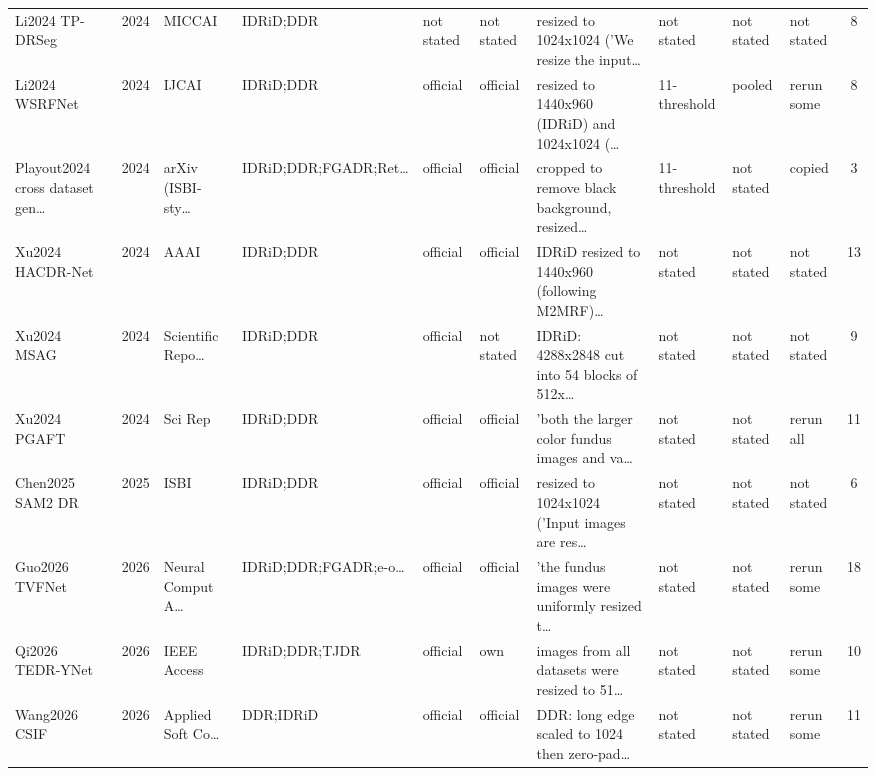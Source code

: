 \begin{landscape}
{\begin{longtable}{p{34mm} c p{20mm} p{24mm} p{14mm} p{14mm} p{48mm} p{18mm} p{14mm} p{16mm} c}
Li2024 TP-DRSeg & 2024 & MICCAI & IDRiD;DDR & not stated & not stated & resized to 1024x1024 ('We resize the input… & not stated & not stated & not stated & 8 \\
Li2024 WSRFNet & 2024 & IJCAI & IDRiD;DDR & official & official & resized to 1440x960 (IDRiD) and 1024x1024 (… & 11-threshold & pooled & rerun some & 8 \\
Playout2024 cross dataset gen… & 2024 & arXiv (ISBI-sty… & IDRiD;DDR;FGADR;Ret… & official & official & cropped to remove black background, resized… & 11-threshold & not stated & copied & 3 \\
Xu2024 HACDR-Net & 2024 & AAAI & IDRiD;DDR & official & official & IDRiD resized to 1440x960 (following M2MRF)… & not stated & not stated & not stated & 13 \\
Xu2024 MSAG & 2024 & Scientific Repo… & IDRiD;DDR & official & not stated & IDRiD: 4288x2848 cut into 54 blocks of 512x… & not stated & not stated & not stated & 9 \\
Xu2024 PGAFT & 2024 & Sci Rep & IDRiD;DDR & official & official & 'both the larger color fundus images and va… & not stated & not stated & rerun all & 11 \\
Chen2025 SAM2 DR & 2025 & ISBI & IDRiD;DDR & official & official & resized to 1024x1024 ('Input images are res… & not stated & not stated & not stated & 6 \\
Guo2026 TVFNet & 2026 & Neural Comput A… & IDRiD;DDR;FGADR;e-o… & official & official & 'the fundus images were uniformly resized t… & not stated & not stated & rerun some & 18 \\
Qi2026 TEDR-YNet & 2026 & IEEE Access & IDRiD;DDR;TJDR & official & own & images from all datasets were resized to 51… & not stated & not stated & rerun some & 10 \\
Wang2026 CSIF & 2026 & Applied Soft Co… & DDR;IDRiD & official & official & DDR: long edge scaled to 1024 then zero-pad… & not stated & not stated & rerun some & 11 \\
\end{longtable}
}
\vspace{-6pt}
\end{landscape}